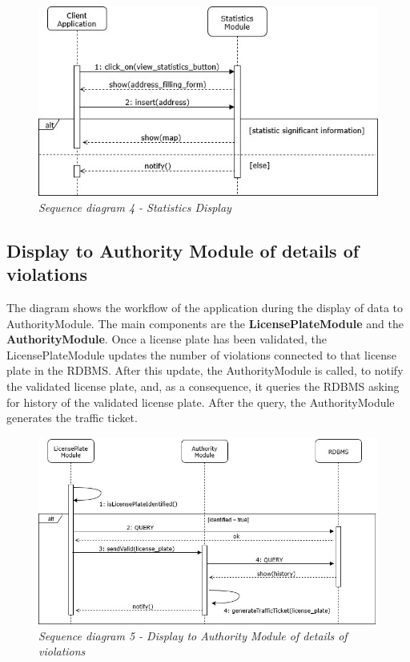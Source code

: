 \begin{figure}[H]
  \centering
  \includegraphics[origin=c,width=\textwidth]{DD_Images/RunTimeView/4.jpg}
  \caption{\textit{Sequence diagram 4 - Statistics Display}}
\end{figure}

\subsection{Display to Authority Module of details of violations}
The diagram shows the workflow of the application during the display of data to AuthorityModule. The main components are the 
\textbf{LicensePlateModule} and the \textbf{AuthorityModule}. Once a license plate has been validated, the LicensePlateModule updates the 
number of violations connected to that license plate in the RDBMS. After this update, the AuthorityModule is called, to notify the validated 
license plate, and, as a consequence, it queries the RDBMS asking for history of the validated license plate. After the query, the AuthorityModule 
generates the traffic ticket.

\begin{figure}[H]
  \centering
  \includegraphics[origin=c,width=\textwidth]{DD_Images/RunTimeView/5.jpg}
  \caption{\textit{Sequence diagram 5 - Display to Authority Module of details of violations}}
\end{figure}

